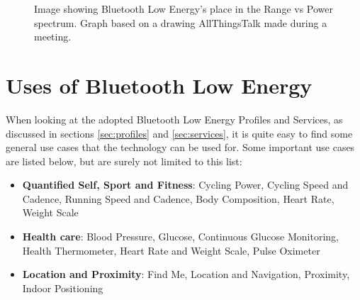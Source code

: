 \documentclass[pdftex,a4paper,12pt,twoside]{report}
\begin{document}
\begin{figure}[h]
\centering
{} 

\caption[Image showing Bluetooth Low Energy's place in the Range vs Power spectrum]{Image showing Bluetooth Low Energy's place in the Range vs Power spectrum. Graph based on a drawing AllThingsTalk made during a meeting.}
\label{fig:powerrange}

\end{figure}

\section{Uses of Bluetooth Low Energy}
\label{sec:usesble}
When looking at the adopted Bluetooth Low Energy Profiles and Services, as discussed in sections \ref{sec:profiles} and \ref{sec:services}, it is quite easy to find some general use cases that the technology can be used for. Some important use cases are listed below, but are surely not limited to this list:

\begin{itemize}
	\item{\textbf{Quantified Self, Sport and Fitness}: Cycling Power, Cycling Speed and Cadence, Running Speed and Cadence, Body Composition, Heart Rate, Weight Scale}
	\item{\textbf{Health care}: Blood Pressure, Glucose, Continuous Glucose Monitoring, Health Thermometer, Heart Rate and Weight Scale, Pulse Oximeter}
	\item{\textbf{Location and Proximity}: Find Me, Location and Navigation, Proximity, Indoor Positioning}
\end{itemize}
\end{document}
